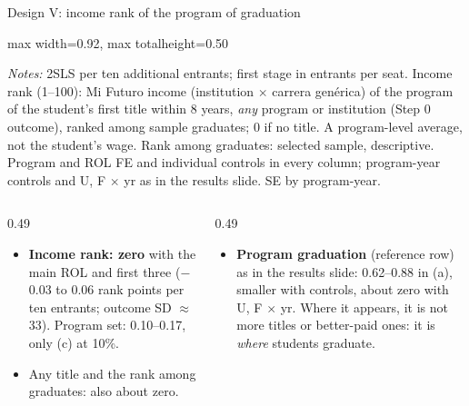 \documentclass{beamer}
\begin{document}
\begin{frame}[label=d5-incrank]{Design V: income rank of the program of graduation}
\centering
\tiny
\begin{adjustbox}{max width=0.92\textwidth, max totalheight=0.50\textheight}

\end{adjustbox}

\vspace{0.02cm}
\parbox{0.97\textwidth}{\tiny \textit{Notes:} 2SLS per ten additional entrants; first stage in entrants per seat. Income rank (1--100): Mi Futuro income (institution $\times$ carrera gen\'erica) of the program of the student's first title within 8 years, \emph{any} program or institution (Step 0 outcome), ranked among sample graduates; 0 if no title. A program-level average, not the student's wage. Rank among graduates: selected sample, descriptive. Program and ROL FE and individual controls in every column; program-year controls and U, F $\times$ yr as in the results slide. SE by program-year.}

\vspace{0.04cm}
\raggedright
\begin{columns}[T,onlytextwidth]
\begin{column}{0.49\textwidth}
\scriptsize
\begin{itemize}
    \setlength{\itemsep}{1pt}
    \item \textbf{Income rank: zero} with the main ROL and first three ($-$0.03 to 0.06 rank points per ten entrants; outcome SD $\approx$ 33). Program set: 0.10--0.17, only (c) at 10\%.
    \item Any title and the rank among graduates: also about zero.
\end{itemize}
\end{column}
\begin{column}{0.49\textwidth}
\scriptsize
\begin{itemize}
    \setlength{\itemsep}{1pt}
    \item \textbf{Program graduation} (reference row) as in the results slide: 0.62--0.88 in (a), smaller with controls, about zero with U, F $\times$ yr. Where it appears, it is not more titles or better-paid ones: it is \emph{where} students graduate.
\end{itemize}
\end{column}
\end{columns}
\end{frame}
\end{document}
